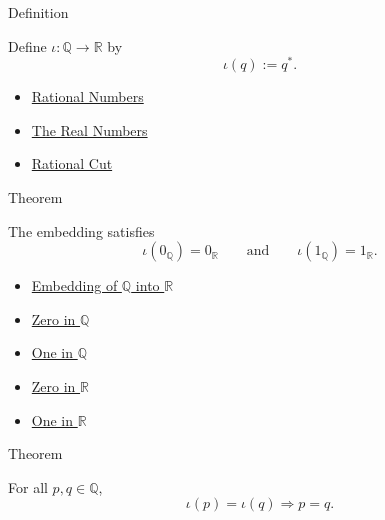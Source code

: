 \begin{definitionbox}{Definition}
\begin{definition}
\label{def:real-chapter-embedding-q-into-r}
Define $\iota:\mathbb{Q}\to\mathbb{R}$ by
\[
\iota(q):=q^{\ast}.
\]
\end{definition}
\end{definitionbox}

\begin{dependencies}
\begin{itemize}
  \item \hyperref[def:rationals]{Rational Numbers}
  \item \hyperref[def:reals]{The Real Numbers}
  \item \hyperref[def:rational-cut]{Rational Cut}
\end{itemize}
\end{dependencies}

\begin{theorembox}{Theorem}
\begin{theorem}
\label{thm:embedding-q-into-r-preserves-zero-one}
The embedding satisfies
\[
\iota(0_{\mathbb{Q}})=0_{\mathbb{R}}
\qquad\text{and}\qquad
\iota(1_{\mathbb{Q}})=1_{\mathbb{R}}.
\]
\end{theorem}
\end{theorembox}

\begin{dependencies}
\begin{itemize}
  \item \hyperref[def:real-chapter-embedding-q-into-r]{Embedding of $\mathbb{Q}$ into $\mathbb{R}$}
  \item \hyperref[def:zero-in-q]{Zero in $\mathbb{Q}$}
  \item \hyperref[def:one-in-q]{One in $\mathbb{Q}$}
  \item \hyperref[def:zero-in-r]{Zero in $\mathbb{R}$}
  \item \hyperref[def:one-in-r]{One in $\mathbb{R}$}
\end{itemize}
\end{dependencies}

\begin{theorembox}{Theorem}
\begin{theorem}
\label{thm:embedding-q-into-r-injective}
For all $p,q\in\mathbb{Q}$,
\[
\iota(p)=\iota(q) \Longrightarrow p=q.
\]
\end{theorem}
\end{theorembox}

